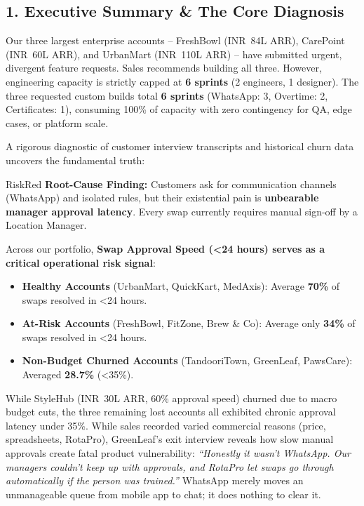 \documentclass[10pt,a4paper]{article}
\newcommand{\INR}{INR~}
\begin{document}
\subsection*{1. Executive Summary \& The Core Diagnosis}
Our three largest enterprise accounts -- FreshBowl (\INR 84L ARR), CarePoint (\INR 60L ARR), and UrbanMart (\INR 110L ARR) -- have submitted urgent, divergent feature requests. Sales recommends building all three. However, engineering capacity is strictly capped at \textbf{6 sprints} (2 engineers, 1 designer). The three requested custom builds total \textbf{6 sprints} (WhatsApp: 3, Overtime: 2, Certificates: 1), consuming 100\% of capacity with zero contingency for QA, edge cases, or platform scale.

A rigorous diagnostic of customer interview transcripts and historical churn data uncovers the fundamental truth:

\begin{accentbox}{RiskRed}
\footnotesize
\textbf{Root-Cause Finding:} Customers ask for communication channels (WhatsApp) and isolated rules, but their existential pain is \textbf{unbearable manager approval latency}. Every swap currently requires manual sign-off by a Location Manager.
\end{accentbox}

\noindent
Across our portfolio, \textbf{Swap Approval Speed (<24 hours) serves as a critical operational risk signal}:
\begin{itemize}
    \item \textbf{Healthy Accounts} (UrbanMart, QuickKart, MedAxis): Average \textbf{70\%} of swaps resolved in <24 hours.
    \item \textbf{At-Risk Accounts} (FreshBowl, FitZone, Brew \& Co): Average only \textbf{34\%} of swaps resolved in <24 hours.
    \item \textbf{Non-Budget Churned Accounts} (TandooriTown, GreenLeaf, PawsCare): Averaged \textbf{28.7\%} (<35\%).
\end{itemize}

While StyleHub (\INR 30L ARR, 60\% approval speed) churned due to macro budget cuts, the three remaining lost accounts all exhibited chronic approval latency under 35\%. While sales recorded varied commercial reasons (price, spreadsheets, RotaPro), GreenLeaf's exit interview reveals how slow manual approvals create fatal product vulnerability: \textit{``Honestly it wasn't WhatsApp. Our managers couldn't keep up with approvals, and RotaPro let swaps go through automatically if the person was trained.''} WhatsApp merely moves an unmanageable queue from mobile app to chat; it does nothing to clear it.
\end{document}
